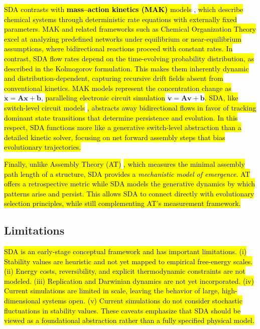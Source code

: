 \documentclass[preprint,12pt]{elsarticle}
\newcommand{\added}[1]{\hl{#1}}
\begin{document}
\added{SDA contrasts with \textbf{mass–action kinetics (MAK)} models}
\cite{fogler1999chemical,TuranyiTomlin2014,heylighen2019chemical}, 
\added{which describe chemical systems through deterministic rate equations with
externally fixed parameters. MAK and related frameworks such as Chemical
Organization Theory} \cite{heylighen2019chemical} \added{excel at analyzing
predefined networks under equilibrium or near-equilibrium assumptions, where
bidirectional reactions proceed with constant rates. In contrast, SDA flow
rates depend on the time-evolving probability distribution, as described in the
Kolmogorov formulation. This makes them inherently dynamic and
distribution-dependent, capturing recursive drift fields absent from
conventional kinetics. MAK models represent the concentration change as}
$\dot{\mathbf{x}} = \mathbf{A}\mathbf{x} + \mathbf{b}$, \added{paralleling electronic circuit simulation} $\dot{\mathbf{v}} = \mathbf{A}\mathbf{v} + \mathbf{b}$\added{. SDA,
like switch-level circuit models} \cite{AdlerCAD} 
\added{, abstracts away bidirectional flows in favor of
tracking dominant state transitions that determine persistence and evolution.
In this respect, SDA functions more like a generative switch-level abstraction than a detailed kinetic solver, focusing on net forward assembly steps that bias evolutionary trajectories.}

\added{
Finally, unlike Assembly Theory (AT)} \cite{walker2023nature}\added{, which
measures the minimal assembly path length of a structure, SDA provides a
\emph{mechanistic model of emergence}. AT offers a retrospective metric while SDA
models the generative dynamics by which patterns arise and persist. This allows
SDA to connect directly with evolutionary selection principles, while still
complementing AT’s measurement framework.}

\subsection*{Limitations}

\added{
SDA is an early-stage conceptual framework and has important limitations.
(i) Stability values are heuristic and not yet mapped to empirical free-energy
scales. (ii) Energy costs, reversibility, and explicit thermodynamic
constraints are not modeled. (iii) Replication and Darwinian dynamics are not
yet incorporated. (iv) Current simulations are limited in scale, leaving the
behavior of large, high-dimensional systems open. (v) Current simulations do not consider stochastic fluctuations in stability values. These caveats emphasize that
SDA should be viewed as a foundational abstraction rather than a fully
specified physical model.
}
\end{document}
